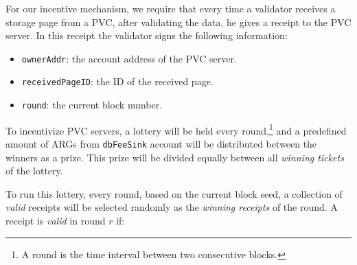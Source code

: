 For our incentive mechanism, we require that every time a validator receives a storage page from a PVC, after
validating the data, he gives a receipt to the PVC server. In this receipt the validator signs the
following information:

\begin{itemize}
    \item \texttt{ownerAddr}: the account address of the PVC server.
    \item \texttt{receivedPageID}: the ID of the received page.
    \item \texttt{round}: the current block number.
\end{itemize}


To incentivize PVC servers, a lottery will be held every round,\footnote{A round is the time interval between
two consecutive blocks.} and a predefined amount of ARGs from
\texttt{dbFeeSink} account will be distributed between the winners as a prize. This prize will be divided equally
between all \emph{winning tickets} of the lottery.


To run this lottery, every round, based on the current block seed, a collection of \emph{valid} receipts will be
selected randomly as the \emph{winning receipts} of the round. A receipt is \emph{valid} in round $r$ if:

